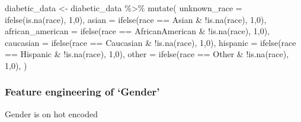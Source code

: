 \documentclass[
]{article}
\newenvironment{Shaded}{\begin{snugshade}}{\end{snugshade}}
\newcommand{\AttributeTok}[1]{\textcolor[rgb]{0.77,0.63,0.00}{#1}}
\newcommand{\DecValTok}[1]{\textcolor[rgb]{0.00,0.00,0.81}{#1}}
\newcommand{\FunctionTok}[1]{\textcolor[rgb]{0.00,0.00,0.00}{#1}}
\newcommand{\NormalTok}[1]{#1}
\newcommand{\OtherTok}[1]{\textcolor[rgb]{0.56,0.35,0.01}{#1}}
\newcommand{\SpecialCharTok}[1]{\textcolor[rgb]{0.00,0.00,0.00}{#1}}
\newcommand{\StringTok}[1]{\textcolor[rgb]{0.31,0.60,0.02}{#1}}
\begin{document}
\begin{Shaded}
\begin{Highlighting}[]
\NormalTok{diabetic\_data }\OtherTok{\textless{}{-}}\NormalTok{ diabetic\_data }\SpecialCharTok{\%\textgreater{}\%}
  \FunctionTok{mutate}\NormalTok{(}
    \AttributeTok{unknown\_race =} \FunctionTok{ifelse}\NormalTok{(}\FunctionTok{is.na}\NormalTok{(race), }\DecValTok{1}\NormalTok{,}\DecValTok{0}\NormalTok{),}
    \AttributeTok{asian =} \FunctionTok{ifelse}\NormalTok{(race }\SpecialCharTok{==} \StringTok{\textquotesingle{}Asian\textquotesingle{}} \SpecialCharTok{\&} \SpecialCharTok{!}\FunctionTok{is.na}\NormalTok{(race), }\DecValTok{1}\NormalTok{,}\DecValTok{0}\NormalTok{),}
    \AttributeTok{african\_american =} \FunctionTok{ifelse}\NormalTok{(race }\SpecialCharTok{==} \StringTok{\textquotesingle{}AfricanAmerican\textquotesingle{}} \SpecialCharTok{\&} \SpecialCharTok{!}\FunctionTok{is.na}\NormalTok{(race), }\DecValTok{1}\NormalTok{,}\DecValTok{0}\NormalTok{),}
    \AttributeTok{caucasian =} \FunctionTok{ifelse}\NormalTok{(race }\SpecialCharTok{==} \StringTok{\textquotesingle{}Caucasian\textquotesingle{}} \SpecialCharTok{\&} \SpecialCharTok{!}\FunctionTok{is.na}\NormalTok{(race), }\DecValTok{1}\NormalTok{,}\DecValTok{0}\NormalTok{),}
    \AttributeTok{hispanic =} \FunctionTok{ifelse}\NormalTok{(race }\SpecialCharTok{==} \StringTok{\textquotesingle{}Hispanic\textquotesingle{}} \SpecialCharTok{\&} \SpecialCharTok{!}\FunctionTok{is.na}\NormalTok{(race), }\DecValTok{1}\NormalTok{,}\DecValTok{0}\NormalTok{),}
    \AttributeTok{other =} \FunctionTok{ifelse}\NormalTok{(race }\SpecialCharTok{==} \StringTok{\textquotesingle{}Other\textquotesingle{}} \SpecialCharTok{\&} \SpecialCharTok{!}\FunctionTok{is.na}\NormalTok{(race), }\DecValTok{1}\NormalTok{,}\DecValTok{0}\NormalTok{),}
\NormalTok{  )}
\end{Highlighting}
\end{Shaded}

\hypertarget{feature-engineering-of-gender}{%
\subsubsection{Feature engineering of
`Gender'}\label{feature-engineering-of-gender}}

Gender is on hot encoded
\end{document}
